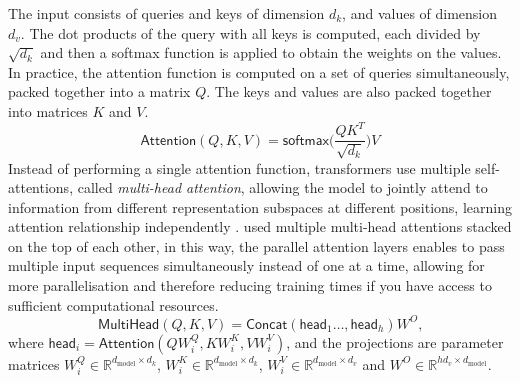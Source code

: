 \documentclass{article}
\begin{document}
	The input consists of queries and keys of dimension $d_k$, and values of dimension $d_v$. The dot 
	products of the query with all keys is computed, each divided by $\sqrt{d_k}$ and then a 
	softmax function is applied to obtain the weights on the values.
	In practice, the attention function is computed on a set of queries simultaneously, packed together 
	into a matrix $Q$. The keys and values are also packed together into matrices $K$ and $V$. 
	\begin{equation}
		\label{eqn:attention}
		\mathsf{Attention}(Q, K, V) = \mathsf{softmax} \big( \frac{QK^T}{\sqrt{d_k}}\big)V
	\end{equation}
	Instead of performing a single attention function, transformers use multiple self-attentions, called 
	\textit{multi-head attention}, allowing the model to jointly attend to information from different 
	representation subspaces at different positions, learning attention relationship independently	
	\cite{vaswani2017attention}.
	\citet{vaswani2017attention} used multiple multi-head attentions stacked on the top of each other, 
	in this way, the parallel attention layers enables to pass multiple input sequences simultaneously 
	instead of one at a time, allowing for more parallelisation and therefore reducing training times if you 
	have access to sufficient computational resources.
	\begin{equation}
		\label{eqn:multihead}
		{\mathsf{MultiHead}(Q, K, V) = \mathsf{Concat}(\mathsf{head}_1 \dots, 
		\mathsf{head}_h) W^O }
		\mbox{,}
	\end{equation}
	where $ \mathsf{head}_i = \mathsf{Attention}(QW_i^Q, KW_i^K , VW_i^V)$, and the 
	projections are parameter matrices $W_i^Q \in \mathbb{R}^{d_{\text{model}}\times 
	d_k}$, %
	$W_i^K \in \mathbb{R}^{d_{\text{model}}\times d_k}$, $W_i^V \in 
	\mathbb{R}^{d_{\text{model}}\times d_v}$ and $W^O \in \mathbb{R}^{hd_v \times 
	d_{\text{model}}}$.
	
\end{document}
